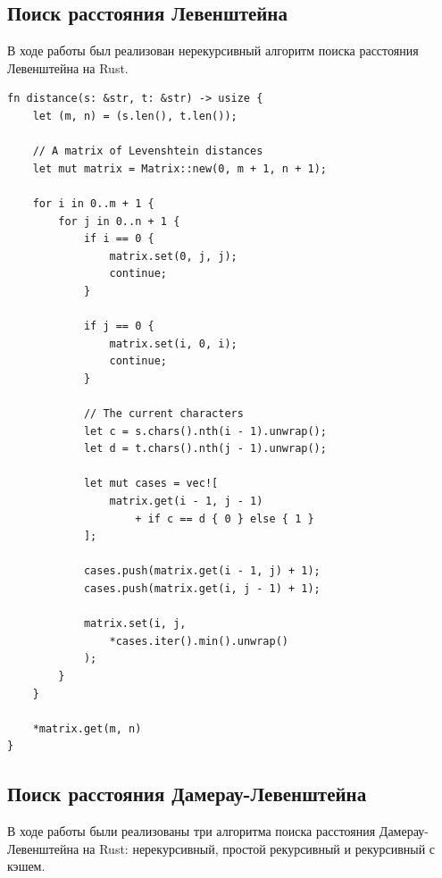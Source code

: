 \documentclass{report}
\begin{document}
\subsection{Поиск расстояния Левенштейна}

В ходе работы был реализован нерекурсивный алгоритм поиска
расстояния Левенштейна на Rust.

\begin{lstlisting}[caption=Реализация нерекурсивного алгоритма]
fn distance(s: &str, t: &str) -> usize {
    let (m, n) = (s.len(), t.len());

    // A matrix of Levenshtein distances
    let mut matrix = Matrix::new(0, m + 1, n + 1);

    for i in 0..m + 1 {
        for j in 0..n + 1 {
            if i == 0 {
                matrix.set(0, j, j);
                continue;
            }

            if j == 0 {
                matrix.set(i, 0, i);
                continue;
            }

            // The current characters
            let c = s.chars().nth(i - 1).unwrap();
            let d = t.chars().nth(j - 1).unwrap();

            let mut cases = vec![
                matrix.get(i - 1, j - 1)
                    + if c == d { 0 } else { 1 }
            ];

            cases.push(matrix.get(i - 1, j) + 1);
            cases.push(matrix.get(i, j - 1) + 1);

            matrix.set(i, j,
                *cases.iter().min().unwrap()
            );
        }
    }

    *matrix.get(m, n)
}
\end{lstlisting}

\subsection{Поиск расстояния Дамерау-Левенштейна}

В ходе работы были реализованы три алгоритма поиска расстояния
Дамерау-Левенштейна на Rust: нерекурсивный, простой рекурсивный и
рекурсивный с кэшем.
\end{document}
